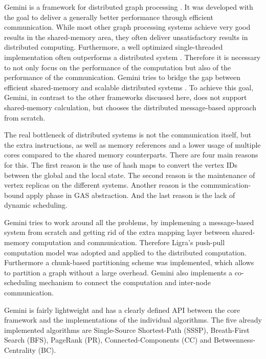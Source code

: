 
Gemini is a framework for distributed graph processing \cite{Gemini}.
It was developed with the goal to deliver a generally better performance through efficient communication.
While most other graph processing systems achieve very good results in the shared-memory area, they often deliver unsatisfactory results in distributed computing.
Furthermore, a well optimized single-threaded implementation often outperforms a distributed system \cite{scalability}.
Therefore it is necessary to not only focus on the performance of the computation but also of the performance of the communication.
Gemini tries to bridge the gap between efficient shared-memory and scalable distributed systems \cite{Gemini}.
To achieve this goal, Gemini, in contrast to the other frameworks discussed here, does not support shared-memory calculation, but chooses the distributed message-based approach from scratch.

The real bottleneck of distributed systems is not the communication itself, but the extra instructions, as well as memory references and a lower usage of multiple cores compared to the shared memory counterparts.
There are four main reasons for this.
The first reason is the use of hash maps to convert the vertex IDs between the global and the local state.
The second reason is the maintenance of vertex replicas on the different systems.
Another reason is the communication-bound apply phase in GAS abstraction.
And the last reason is the lack of dynamic scheduling.

Gemini tries to work around all the problems, by implemening a message-based system from scratch and getting rid of the extra mapping layer between shared-memory computation and communication.
Therefore Ligra's push-pull computation model was adopted and applied to the distributed computation.
Furthermore a chunk-based partitioning scheme was implemented, which allows to partition a graph without a large overhead.
Gemini also implements a co-scheduling mechanism to connect the computation and inter-node communication.

Gemini is fairly lightweight and has a clearly defined API between the core framework and the implementations of the individual algorithms. The five already implemented algorithms are Single-Source Shortest-Path (SSSP), Breath-First Search (BFS), PageRank (PR), Connected-Components (CC) and Betweenness-Centrality (BC).

